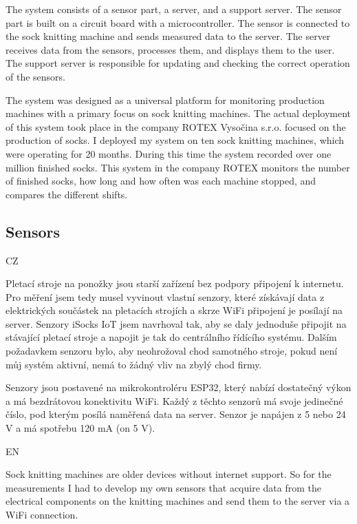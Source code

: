 \documentclass[12pt, a4paper]{article}
\begin{document}
The system consists of a sensor part, a server, and a support server.
The sensor part is built on a circuit board with a microcontroller.
The sensor is connected to the sock knitting machine and sends measured data to the server.
The server receives data from the sensors, processes them, and displays them to the user.
The support server is responsible for updating and checking the correct operation of the sensors.

The system was designed as a universal platform for monitoring production machines with a primary focus on sock knitting machines.
The actual deployment of this system took place in the company ROTEX Vysočina s.r.o. focused on the production of socks.
I deployed my system on ten sock knitting machines, which were operating for 20 months.
During this time the system recorded over one million finished socks.
This system in the company ROTEX monitors the number of finished socks, how long and how often was each machine stopped, and compares the different shifts.


\subsection*{Sensors}
CZ

Pletací stroje na ponožky jsou starší zařízení bez podpory připojení k internetu.
Pro měření jsem tedy musel vyvinout vlastní  senzory, které získávají data z elektrických součástek na pletacích  strojích a skrze WiFi připojení je posílají  na server.
Senzory iSocks IoT jsem navrhoval tak, aby se daly jednoduše připojit na stávající pletací stroje a napojit je tak do centrálního řídícího systému.
Dalším požadavkem senzoru bylo, aby neohrožoval chod samotného stroje, pokud není můj systém aktivní, nemá to žádný vliv na zbylý chod firmy.

Senzory jsou postavené na mikrokontroléru ESP32, který nabízí dostatečný výkon a má bezdrátovou konektivitu WiFi.
Každý z těchto senzorů má svoje jedinečné číslo, pod kterým posílá naměřená data na server.
Senzor je napájen z 5 nebo 24 V a má spotřebu 120 mA (on 5 V).

EN

Sock knitting machines are older devices without internet support.
So for the measurements I had to develop my own sensors that acquire data from the electrical components on the knitting machines and send them to the server via a WiFi connection.
\end{document}
